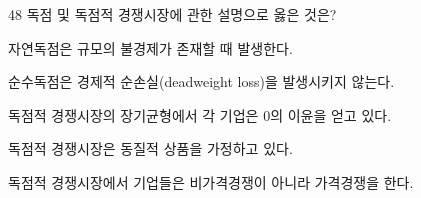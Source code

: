 \begin{question}{48}
독점 및 독점적 경쟁시장에 관한 설명으로 옳은 것은?
\begin{choices}
  \item 자연독점은 규모의 불경제가 존재할 때 발생한다.
  \item 순수독점은 경제적 순손실(deadweight loss)을 발생시키지 않는다.
  \item 독점적 경쟁시장의 장기균형에서 각 기업은 0의 이윤을 얻고 있다.
  \item 독점적 경쟁시장은 동질적 상품을 가정하고 있다.
  \item 독점적 경쟁시장에서 기업들은 비가격경쟁이 아니라 가격경쟁을 한다.
\end{choices}
\end{question}
